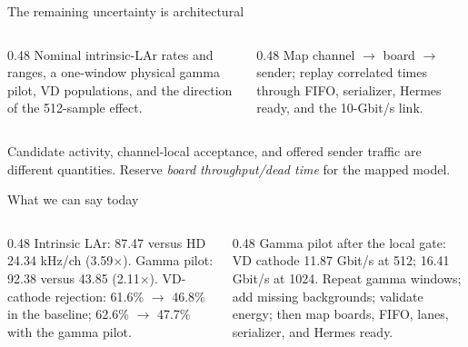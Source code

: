 \documentclass[aspectratio=169,11pt]{beamer}
\begin{document}
\begin{frame}{The remaining uncertainty is architectural}
  \begin{columns}[T,onlytextwidth]
    \begin{column}{0.48\textwidth}
        {Nominal intrinsic-LAr rates and ranges, a one-window physical gamma pilot, VD populations, and the direction of the 512-sample effect.}
    \end{column}
    \begin{column}{0.48\textwidth}
        {Map channel \(\rightarrow\) board \(\rightarrow\) sender; replay correlated times through FIFO, serializer, Hermes ready, and the 10-Gbit/s link.}
    \end{column}
  \end{columns}

  \medskip
        {Candidate activity, channel-local acceptance, and offered sender traffic are different quantities. Reserve \emph{board throughput/dead time} for the mapped model.}

\end{frame}

\begin{frame}{What we can say today}
  \begin{columns}[T,onlytextwidth]
    \begin{column}{0.48\textwidth}
        {Intrinsic LAr: 87.47 versus HD 24.34 kHz/ch (3.59$\times$). Gamma pilot: 92.38 versus 43.85 (2.11$\times$).}
      \smallskip
        {VD-cathode rejection: 61.6\% $\rightarrow$ 46.8\% in the baseline; 62.6\% $\rightarrow$ 47.7\% with the gamma pilot.}
    \end{column}
    \begin{column}{0.48\textwidth}
        {Gamma pilot after the local gate: VD cathode 11.87 Gbit/s at 512; 16.41 Gbit/s at 1024.}
      \smallskip
        {Repeat gamma windows; add missing backgrounds; validate energy; then map boards, FIFO, lanes, serializer, and Hermes ready.}
    \end{column}
  \end{columns}
\end{frame}
\end{document}
